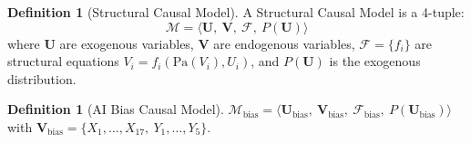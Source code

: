 \documentclass[12pt,a4paper]{report}
\theoremstyle{plain}
\theoremstyle{definition}
\newtheorem{definition}[theorem]{Definition}
\theoremstyle{remark}
\newcommand{\scmmodel}{\mathcal{M}}
\newcommand{\Pa}{\text{Pa}}
\begin{document}
\begin{definition}[Structural Causal Model]
\label{def:scm}
A Structural Causal Model is a 4-tuple:
\begin{equation}
    \scmmodel = \langle \mathbf{U},\ \mathbf{V},\
    \mathcal{F},\ P(\mathbf{U}) \rangle
\end{equation}
where $\mathbf{U}$ are exogenous variables,
$\mathbf{V}$ are endogenous variables,
$\mathcal{F} = \{f_i\}$ are structural equations
$V_i = f_i(\Pa(V_i), U_i)$, and $P(\mathbf{U})$
is the exogenous distribution.
\end{definition}

\begin{definition}[AI Bias Causal Model]
\label{def:bias-scm}
$\scmmodel_{\text{bias}} =
\langle \mathbf{U}_{\text{bias}},\ \mathbf{V}_{\text{bias}},\
\mathcal{F}_{\text{bias}},\ P(\mathbf{U}_{\text{bias}}) \rangle$
with $\mathbf{V}_{\text{bias}} = \{X_1,\ldots,X_{17},\
Y_1,\ldots,Y_5\}$.
\end{definition}
\end{document}
